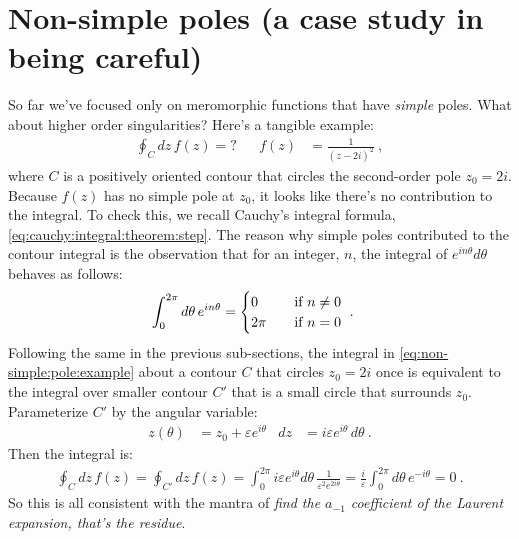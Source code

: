 \section{Non-simple poles (a case study in being careful)}
\label{sec:complex:cauchy:int:thm:factorizing:be:careful}

So far we've focused only on meromorphic functions that have \emph{simple} poles. What about higher order singularities? Here's a tangible example:
\begin{align}
  \oint_C dz \, f(z) = ?
  &&
  f(z) &= \frac{1}{(z-2i)^2} \ ,
  \label{eq:non-simple:pole:example}
\end{align}
where $C$ is a positively oriented contour that circles the second-order pole $z_0 = 2i$. Because $f(z)$ has no simple pole at $z_0$, it looks like there's no contribution to the integral. To check this, we recall Cauchy's integral formula, \eqref{eq:cauchy:integral:theorem:step}. The reason why simple poles contributed to the contour integral is the observation that for an integer,  $n$, the integral of $e^{in\theta}d\theta$ behaves as follows: 
\begin{align}
  \int_0^{2\pi}d\theta\, e^{in\theta} 
  &=
  \begin{cases}
  0 & \text{\quad if } n\neq 0
  \\
  2\pi  & \text{\quad if } n= 0
  \end{cases} \ .
\end{align}
Following the same in the previous sub-sections, the integral in \eqref{eq:non-simple:pole:example} about a contour $C$ that circles $z_0=2i$ once is equivalent to the integral over smaller contour $C'$ that is a small circle that surrounds $z_0$. Parameterize $C'$ by the angular variable:
\begin{align}
  z(\theta) &= z_0 + \varepsilon e^{i\theta} & dz &= i\varepsilon e^{i\theta} \, d\theta \ .
\end{align}
Then the integral is:
\begin{align}
  \oint_C dz\, f(z) 
  = 
  \oint_{C'} dz\, f(z) 
  = 
  \int_0^{2\pi} i\varepsilon e^{i\theta} d\theta\, 
  \frac{1}{\varepsilon^2 e^{2i\theta}} 
  =
  \frac{i}{\varepsilon}
  \int_0^{2\pi} d\theta\, 
  e^{-i\theta}
  = 0 \ .
  \label{eq:non-simple:pole:eg:zero}
\end{align}
So this is all consistent with the mantra of \emph{find the $a_{-1}$ coefficient of the Laurent expansion, that's the residue}. 

